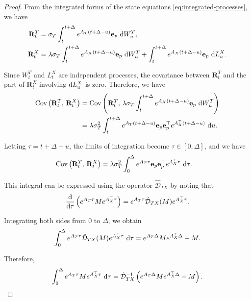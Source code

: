 \documentclass[10pt,a4paper,reqno]{amsart}
\theoremstyle{example}
\newcommand{\Cov}{\mathrm{Cov}}
\newcommand*\D{\mathop{}\!\textnormal{d}}
\begin{document}
\begin{proof}
From the integrated forms of the state equations \eqref{eq:integrated-processes}, we have
\begin{align*}
\mathbf{R}_t^T &= \sigma_T \int_t^{t+\Delta} e^{A_T (t+\Delta - u)} \mathbf{e}_p \, \D W_u^T, \\
\mathbf{R}_t^X &= \lambda \sigma_T \int_t^{t+\Delta} e^{A_X (t+\Delta - u)} \mathbf{e}_p \, \D W_u^T + \int_t^{t+\Delta} e^{A_X (t+\Delta - u)} \mathbf{e}_p \, \D L_u^X.
\end{align*}

Since $W_t^T$ and $L_t^X$ are independent processes, the covariance between $\mathbf{R}_t^T$ and the part of $\mathbf{R}_t^X$ involving $\D L_u^X$ is zero. Therefore, we have
\begin{align*}
\Cov\left( \mathbf{R}_t^T,\, \mathbf{R}_t^X \right) &= \Cov\left( \mathbf{R}_t^T,\, \lambda \sigma_T \int_t^{t+\Delta} e^{A_X (t+\Delta - u)} \mathbf{e}_p \, \D W_u^T \right) \\
&= \lambda \sigma_T^2 \int_t^{t+\Delta} e^{A_T (t+\Delta - u)} \mathbf{e}_p \mathbf{e}_p^\top e^{A_X^\top (t+\Delta - u)} \, \D u.
\end{align*}

Letting $\tau = t+\Delta - u$, the limits of integration become $\tau \in [0, \Delta]$, and we have
\begin{align*}
\Cov\left( \mathbf{R}_t^T,\, \mathbf{R}_t^X \right) &= \lambda \sigma_T^2 \int_0^{\Delta} e^{A_T \tau} \mathbf{e}_p \mathbf{e}_p^\top e^{A_X^\top \tau} \, \D \tau.
\end{align*}

This integral can be expressed using the operator $\hat{\mathcal{D}}_{TX}$ by noting that
\begin{align*}
\frac{\D}{\D \tau} \left( e^{A_T \tau} M e^{A_X^\top \tau} \right) = e^{A_T \tau} \hat{\mathcal{D}}_{TX}(M) e^{A_X^\top \tau}.
\end{align*}

Integrating both sides from $0$ to $\Delta$, we obtain
\begin{align*}
\int_0^{\Delta} e^{A_T \tau} \hat{\mathcal{D}}_{TX}(M) e^{A_X^\top \tau} \, \D \tau = e^{A_T \Delta} M e^{A_X^\top \Delta} - M.
\end{align*}

Therefore,
\begin{align*}
\int_0^{\Delta} e^{A_T \tau} M e^{A_X^\top \tau} \, \D \tau = \hat{\mathcal{D}}_{TX}^{-1} \left( e^{A_T \Delta} M e^{A_X^\top \Delta} - M \right).
\end{align*}


\end{proof}
\end{document}
